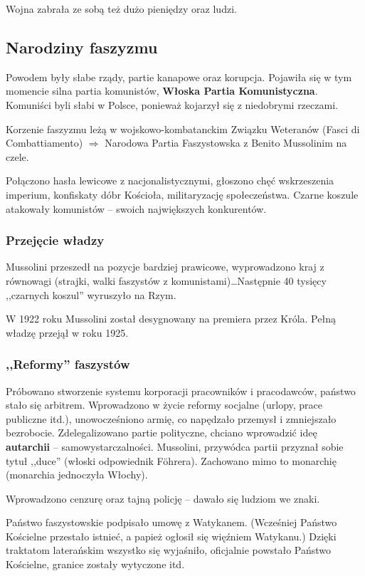 \documentclass [a4paper, 11pt, oneside]{book}
\begin{document}
		Wojna zabrała ze sobą też dużo pieniędzy oraz ludzi.

	\subsection{Narodziny faszyzmu}
		Powodem były słabe rządy, partie kanapowe oraz korupcja. Pojawiła się w tym momencie silna partia komunistów, \textbf{Włoska Partia Komunistyczna}. Komuniści byli słabi w Polsce, ponieważ kojarzył się z niedobrymi rzeczami.

		Korzenie faszyzmu leżą w wojskowo-kombatanckim Związku Weteranów (Fasci di Combattiamento) $\Rightarrow$ Narodowa Partia Faszystowska z Benito Mussolinim na czele.

		Połączono hasła lewicowe z nacjonalistycznymi, głoszono chęć wskrzeszenia imperium, konfiskaty dóbr Kościoła, militaryzację społeczeństwa. Czarne koszule atakowały komunistów -- swoich największych konkurentów.

		\subsubsection{Przejęcie władzy}
			Mussolini przeszedł na pozycje bardziej prawicowe, wyprowadzono kraj z równowagi (strajki, walki faszystów z komunistami)\dots Następnie 40 tysięcy ,,czarnych koszul'' wyruszyło na Rzym.

			W 1922 roku Mussolini został desygnowany na premiera przez Króla. Pełną władzę przejął w roku 1925.
		\subsubsection{,,Reformy'' faszystów}
			Próbowano stworzenie systemu korporacji pracowników i pracodawców, państwo stało się arbitrem. Wprowadzono w życie reformy socjalne (urlopy, prace publiczne itd.), unowocześniono armię, co napędzało przemysł i zmniejszało bezrobocie. Zdelegalizowano partie polityczne, chciano wprowadzić ideę \textbf{autarchii} -- samowystarczalności. Mussolini, przywódca partii przyznał sobie tytuł ,,duce'' (włoski odpowiednik F\"{o}hrera). Zachowano mimo to monarchię (monarchia jednoczyła Włochy).

			Wprowadzono cenzurę oraz tajną policję -- dawało się ludziom we znaki.
			
			Państwo faszystowskie podpisało umowę z Watykanem. (Wcześniej Państwo Kościelne przestało istnieć, a papież ogłosił się więźniem Watykanu.) Dzięki traktatom laterańskim wszystko się wyjaśniło, oficjalnie powstało Państwo Kościelne, granice zostały wytyczone itd.
\end{document}
